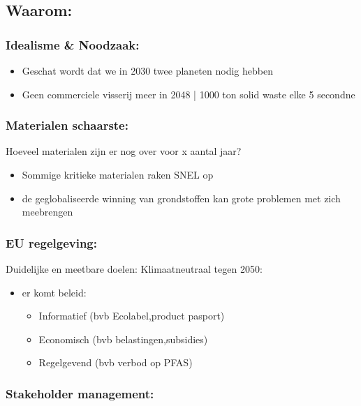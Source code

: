 \documentclass[12pt]{article}
\begin{document}
\subsection{Waarom:}
\subsubsection{Idealisme \& Noodzaak:}
\begin{itemize}
    \item Geschat wordt dat we in 2030 twee planeten nodig hebben
    \item Geen commerciele visserij meer in 2048 | 1000 ton solid waste elke 5 secondne
\end{itemize}
\subsubsection{Materialen schaarste:}
Hoeveel materialen zijn er nog over voor x aantal jaar?\begin{itemize}
    \item Sommige kritieke materialen raken SNEL op
    \item de geglobaliseerde winning van grondstoffen kan grote problemen met zich meebrengen 
\end{itemize}
\subsubsection{EU regelgeving:}
Duidelijke en meetbare doelen: Klimaatneutraal tegen 2050:\begin{itemize}
    \item er komt beleid:\begin{itemize}
        \item Informatief (bvb Ecolabel,product pasport)
        \item Economisch (bvb belastingen,subsidies)
        \item Regelgevend (bvb verbod op PFAS)
    \end{itemize}
\end{itemize}
\subsubsection{Stakeholder management:}
\end{document}
